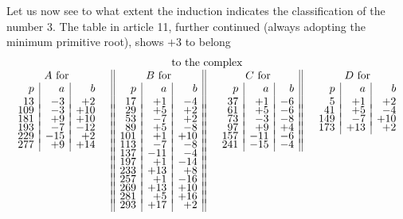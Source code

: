 \documentclass[twoside,12pt, showframe]{memoir}
\begin{document}
Let us now see to what extent the induction indicates the classification of the number 3. The table in article 11, further continued (always adopting the minimum primitive root), shows \(+3\) to belong
\[\begin{array}{cccc}
\multicolumn{4}{c}{\text{to the complex}}\\
\begin{array}[t]{r|r|r} 
\multicolumn{3}{c}{ A \text{ for} }\\
p & a & b \\
13 & -3 & +2 \\[-4pt]
109 & -3 & +10 \\[-4pt]
181 & +9 & +10 \\[-4pt]
193 & -7 & -12 \\[-4pt]
229 & -15 & +2 \\[-4pt]
277 & +9 & +14 
\end{array} & 
\begin{array}[t]{||r|r|r||} 
\multicolumn{3}{||c||}{ B \text{ for} }\\
p & a & b \\
17&+1&-4\\[-4pt]
29&+5&+2\\[-4pt]
53&-7&+2\\[-4pt]
89&+5&-8\\[-4pt]
101&+1&+10\\[-4pt]
113&-7&-8\\[-4pt]
137&-11&-4\\[-4pt]
197&+1&-14\\[-4pt]
233&+13&+8\\[-4pt]
257&+1&-16\\[-4pt]
269&+13&+10\\[-4pt]
281&+5&+16\\[-4pt]
293&+17&+2
\end{array}&
\begin{array}[t]{r|r|r||}
\multicolumn{3}{c||}{ C \text{ for} }\\
p & a & b \\
37&+1&-6\\[-4pt]
61&+5&-6\\[-4pt]
73&-3&-8\\[-4pt]
97&+9&+4\\[-4pt]
157&-11&-6\\[-4pt] 
241&-15&-4 
\end{array}
&
\begin{array}[t]{r|r|r} 
\multicolumn{3}{c}{ D \text{ for} }\\
p & a & b \\
5&+1&+2\\[-4pt]
41&+5&-4\\[-4pt]
149&-7&+10\\[-4pt]
173&+13&+2
\end{array}
\end{array}\]
%
\end{document}
